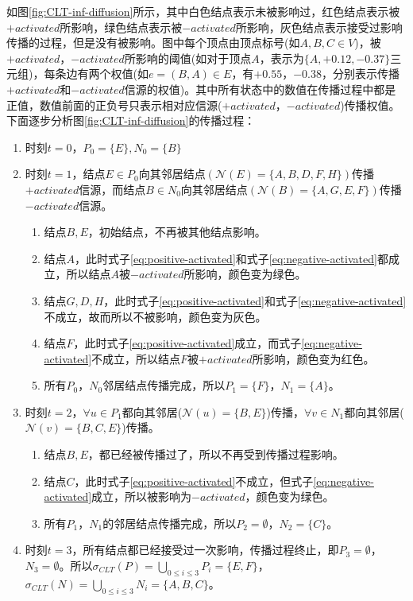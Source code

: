 如图\ref{fig:CLT-inf-diffusion}所示，其中白色结点表示未被影响过，红色结点表示被$+activated$所影响，绿色结点表示被$-activated$所影响，灰色结点表示接受过影响传播的过程，但是没有被影响。图中每个顶点由顶点标号(如$A, B, C \in V$)，被$+activated$，$-activated$所影响的阈值(如对于顶点$A$，表示为$\{A, +0.12, -0.37\}$三元组)，每条边有两个权值(如$e = (B, A) \in E$，有$+0.55$，$-0.38$，分别表示传播$+activated$和$-activated$信源的权值)。其中所有状态中的数值在传播过程中都是正值，数值前面的正负号只表示相对应信源($+activated$，$-activated$)传播权值。下面逐步分析图\ref{fig:CLT-inf-diffusion}的传播过程：
\begin{enumerate}
\item 时刻$t=0$，$P_{0}=\{E\}, N_{0}=\{B\}$
\item 时刻$t=1$，结点$E \in P_{0}$向其邻居结点$(\mathcal{N}(E)=\{A, B, D, F, H\})$传播$+activated$信源，而结点$B \in N_{0}$向其邻居结点$(\mathcal{N}(B)=\{A, G, E, F\})$传播$-activated$信源。
	\begin{enumerate}
	\item 结点$B, E$，初始结点，不再被其他结点影响。
	\item 结点$A$，此时式子\ref{eq:positive-activated}和式子\ref{eq:negative-activated}都成立，所以结点$A$被$-activated$所影响，颜色变为绿色。
	\item 结点$G, D, H$，此时式子\ref{eq:positive-activated}和式子\ref{eq:negative-activated}不成立，故而所以不被影响，颜色变为灰色。
	\item 结点$F$，此时式子\ref{eq:positive-activated}成立，而式子\ref{eq:negative-activated}不成立，所以结点$F$被$+activated$所影响，颜色变为红色。
	\item 所有$P_{0}$，$N_{0}$邻居结点传播完成，所以$P_{1}=\{ F\}$，$N_{1}=\{A\}$。
	\end{enumerate}
\item 时刻$t=2$，$\forall u \in P_{1}$都向其邻居($\mathcal{N}(u)=\{B, E\}$)传播，$\forall v \in N_{1}$都向其邻居($\mathcal{N}(v)=\{B, C, E\}$)传播。
	\begin{enumerate}
	\item 结点$B, E$，都已经被传播过了，所以不再受到传播过程影响。
	\item 结点$C$，此时式子\ref{eq:positive-activated}不成立，但式子\ref{eq:negative-activated}成立，所以被影响为$-activated$，颜色变为绿色。
	\item 所有$P_{1}$，$N_{1}$的邻居结点传播完成，所以$P_{2}=\emptyset$，$N_{2}=\{C\}$。
	\end{enumerate}
\item 时刻$t=3$，所有结点都已经接受过一次影响，传播过程终止，即$P_{3}=\emptyset$，$N_{3}=\emptyset$。所以$\sigma_{CLT}(P)=\bigcup_{0 \leq i \leq 3}P_{i}=\{E, F\}$，$\sigma_{CLT}(N)=\bigcup_{0 \leq i \leq 3}N_{i}=\{A, B, C\}$。
\end{enumerate}


